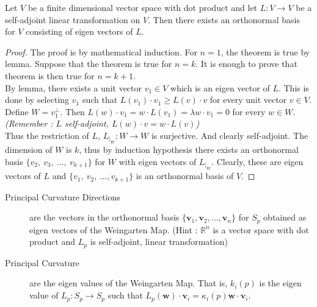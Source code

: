 \begin{theorem}
	Let $V$ be a finite dimensional vector space with dot product and let $L : V \to V$ be a self-adjoint linear transformation on $V$. Then there exists an orthonormal basis for $V$ consisting of eigen vectors of $L$.
\end{theorem}
\begin{proof}
	The proof is by mathematical induction.
	For $n=1$, the theorem is true by lemma.%
	Suppose that the theorem is true for $n = k$. It is enough to prove that theorem is then true for $n=k+1$.\\

	By lemma, there exists a unit vector $v_1 \in V$ which is an eigen vector of $L$. This is done by selecting $v_1$ such that $L(v_1) \cdot v_1 \ge L(v) \cdot v$ for every unit vector $v \in V$. Define $W = v_1^\perp$. Then $L(w) \cdot v_1 = w \cdot L(v_1) = \lambda w \cdot v_1 = 0$ for every $w \in W$. \textit{(Remember : $L$ self-adjoint, $L(w) \cdot v = w \cdot L(v)$)}\\

	Thus the restriction of $L$, $L_{|_W} : W \to W$ is surjective. And clearly self-adjoint. The dimension of $W$ is $k$, thus by induction hypothesis there exists an orthonormal basis $\{ v_2,\ v_3,\ \dots,\ v_{k+1} \}$ for $W$ with eigen vectors of $L_{|_W}$. Clearly, these are eigen vectors of $L$ and $\{ v_1,\ v_2,\ \dots, v_{k+1} \}$ is an orthonormal basis of $V$.
\end{proof}

\begin{description}
	\item[Principal Curvature Directions] are the vectors in the orthonormal basis $\{ \mathbf{v}_1,\mathbf{v}_2,\dots,\mathbf{v}_n \}$ for $S_p$ obtained as eigen vectors of the Weingarten Map. (Hint : $\mathbb{R}^n$ is a vector space with dot product and $L_p$ is self-adjoint, linear transformation)
	\item[Principal Curvature] are the eigen values of the Weingarten Map. That is, $k_i(p)$ is the eigen value of $L_p : S_p \to S_p$ such that $L_p(\mathbf{w}) \cdot \mathbf{v}_i = \kappa_i(p) \mathbf{w} \cdot \mathbf{v}_i$.
\end{description}

